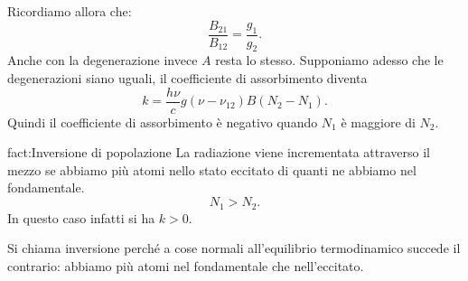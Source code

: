 Ricordiamo allora che:
\[
\frac{B_{21}}{B_{12}} = \frac{g_1}{g_2}
.\] 
Anche con la degenerazione invece $A$ resta lo stesso. Supponiamo adesso che le degenerazioni siano uguali, il coefficiente di assorbimento diventa
\[
    k=\frac{h\nu}{c}g(\nu-\nu_{12})B (N_2-N_1) 
.\] 
Quindi il coefficiente di assorbimento è negativo quando $N_1$ è maggiore di $N_2$. \\
\begin{fact}{fact:Inversione di popolazione}
La radiazione viene incrementata attraverso il mezzo se abbiamo più atomi nello stato eccitato di quanti ne abbiamo nel fondamentale.
\[
    N_1>N_2
.\] 
In questo caso infatti si ha $k>0$.
\end{fact}
Si chiama inversione perché a cose normali all'equilibrio termodinamico succede il contrario: abbiamo più atomi nel fondamentale che nell'eccitato.
